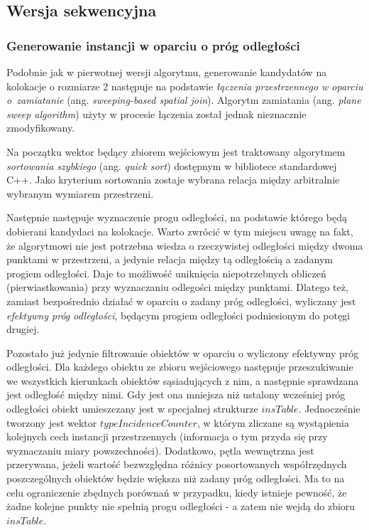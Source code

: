 \documentclass[12pt]{article}
\begin{document}
\subsection{Wersja sekwencyjna}

\subsubsection{Generowanie instancji w oparciu o próg odległości}
\label{subsec:cpu-step-1}

Podobnie jak w pierwotnej wersji algorytmu, generowanie kandydatów na kolokacje o rozmiarze 2 następuje na podstawie \textit{łączenia przestrzennego w oparciu o~zamiatanie} (ang. \textit{sweeping-based spatial join}). Algorytm zamiatania (ang. \textit{plane sweep algorithm}) użyty w procesie łączenia został jednak nieznacznie zmodyfikowany.

Na początku wektor będący zbiorem wejściowym jest traktowany algorytmem \textit{sortowania szybkiego} (ang. \textit{quick sort}) dostępnym w bibliotece standardowej C++. Jako kryterium sortowania zostaje wybrana relacja między arbitralnie wybranym wymiarem przestrzeni.

Następnie następuje wyznaczenie progu odległości, na podstawie którego będą dobierani kandydaci na kolokacje. Warto zwrócić w tym miejscu uwagę na fakt, że algorytmowi nie jest potrzebna wiedza o rzeczywistej odległości między dwoma punktami w przestrzeni, a jedynie relacja między tą odległością a zadanym progiem odległości. Daje to możliwość uniknięcia niepotrzebnych obliczeń (pierwiastkowania) przy wyznaczaniu odlegości między punktami. Dlatego też, zamiast bezpośrednio działać w oparciu o zadany próg odległości, wyliczany jest \textit{efektywny próg odległości}, będącym progiem odległości podniesionym do potęgi drugiej. 

Pozostało już jedynie filtrowanie obiektów w oparciu o wyliczony efektywny próg odległości. Dla każdego obiektu ze zbioru wejściowego następuje przeszukiwanie we wszystkich kierunkach obiektów sąsiadujących z nim, a następnie sprawdzana jest odległość między nimi. Gdy jest ona mniejsza niż ustalony wcześniej próg odległości obiekt umieszczany jest w specjalnej strukturze $ insTable $. Jednocześnie tworzony jest wektor $ typeIncidenceCounter$, w którym zliczane są wystąpienia kolejnych cech instancji przestrzennych (informacja o tym przyda się przy wyznaczaniu miary powszechności). Dodatkowo, pętla wewnętrzna jest przerywana, jeżeli wartość bezwzględna różnicy posortowanych współrzędnych poszczególnych obiektów będzie większa niż zadany próg odległości. Ma to na celu ograniczenie zbędnych porównań w przypadku, kiedy istnieje pewność, że żadne kolejne punkty nie spełnią progu odległości - a zatem nie wejdą do zbioru $ insTable $.
 
\end{document}
